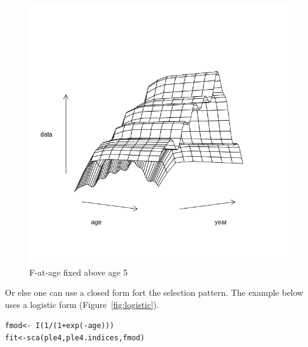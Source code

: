 \documentclass[a4paper,english,10pt]{article}\usepackage[]{graphicx}\usepackage[]{color}
\makeatletter
\newcommand{\hlnum}[1]{\textcolor[rgb]{0.063,0.58,0.627}{#1}}%
\newcommand{\hlopt}[1]{\textcolor[rgb]{0.196,0.196,0.196}{#1}}%
\newcommand{\hlstd}[1]{\textcolor[rgb]{0.196,0.196,0.196}{#1}}%
\newcommand{\hlkwb}[1]{\textcolor[rgb]{0.627,0,0.314}{#1}}%
\newcommand{\hlkwd}[1]{\textcolor[rgb]{0.78,0.227,0.412}{#1}}%
\newenvironment{kframe}{%
 \def\at@end@of@kframe{}%
 \ifinner\ifhmode%
  \def\at@end@of@kframe{\end{minipage}}%
  \begin{minipage}{\columnwidth}%
 \fi\fi%
 \def\FrameCommand##1{\hskip\@totalleftmargin \hskip-\fboxsep
 \colorbox{shadecolor}{##1}\hskip-\fboxsep
     \hskip-\linewidth \hskip-\@totalleftmargin \hskip\columnwidth}%
 \MakeFramed {\advance\hsize-\width
   \@totalleftmargin\z@ \linewidth\hsize
   \@setminipage}}%
 {\par\unskip\endMakeFramed%
 \at@end@of@kframe}
\newenvironment{knitrout}{}{} %
\makeatother
\begin{document}
\begin{knitrout}
\color{fgcolor}\begin{figure}[H]

{\centering \includegraphics[width=.9\linewidth]{figure/rep-1} 

}

\caption[F-at-age fixed above age 5]{F-at-age fixed above age 5}\label{fig:rep}
\end{figure}


\end{knitrout}

Or else one can use a closed form fort the selection pattern. The example below uses a logistic form (Figure~\ref{fig:logistic}).

\begin{knitrout}
\color{fgcolor}\begin{kframe}
\begin{alltt}
\hlstd{fmod} \hlkwb{<-} \hlopt{~}\hlkwd{I}\hlstd{(}\hlnum{1}\hlopt{/}\hlstd{(}\hlnum{1} \hlopt{+} \hlkwd{exp}\hlstd{(}\hlopt{-}\hlstd{age)))}
\hlstd{fit} \hlkwb{<-} \hlkwd{sca}\hlstd{(ple4, ple4.indices, fmod)}
\end{alltt}
\end{kframe}
\end{knitrout}
\end{document}
